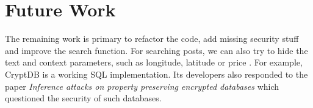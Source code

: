 \documentclass{scrartcl}
\begin{document}
\section{Future Work}
The remaining work is primary to refactor the code, add missing security stuff and improve the search function.
For searching posts, we can also try to hide the text and context  parameters, such as longitude, latitude or price . For example,  CryptDB \cite{cryptdb} is a working SQL implementation. Its developers also responded to the paper  \emph{Inference attacks on property preserving encrypted databases} \cite{INF} which questioned the security of such databases.
%
%
%
\end{document}
